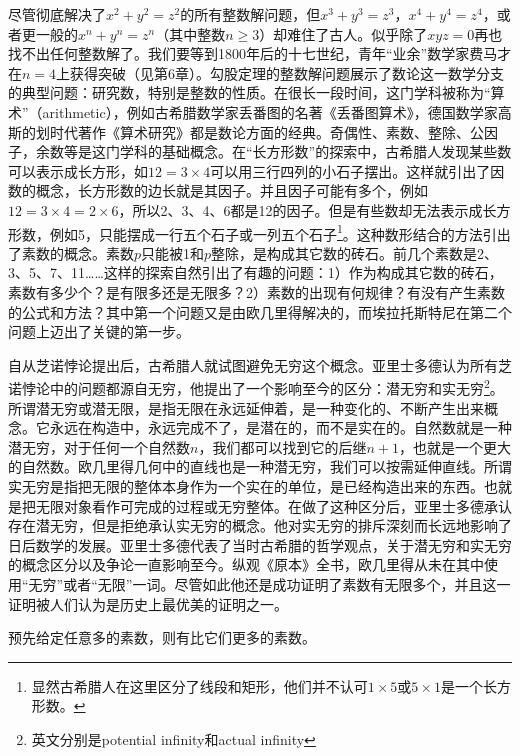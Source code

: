 \documentclass[b5paper]{ctexart}
\begin{document}
尽管彻底解决了$x^2 + y^2 = z^2$的所有整数解问题，但$x^3 + y^3 = z^3$，$x^4 + y^4 = z^4$，或者更一般的$x^n + y^n = z^n$（其中整数$n \geq 3$）却难住了古人。似乎除了$xyz = 0$再也找不出任何整数解了。我们要等到1800年后的十七世纪，青年“业余”数学家费马才在$n = 4$上获得突破（见第6章）。勾股定理的整数解问题展示了数论这一数学分支的典型问题：研究数，特别是整数的性质。在很长一段时间，这门学科被称为“算术”（arithmetic），例如古希腊数学家丢番图的名著《丢番图算术》，德国数学家高斯的划时代著作《算术研究》都是数论方面的经典。奇偶性、素数、整除、公因子，余数等是这门学科的基础概念。在“长方形数”的探索中，古希腊人发现某些数可以表示成长方形，如$12 = 3 \times 4$可以用三行四列的小石子摆出。这样就引出了因数的概念，长方形数的边长就是其因子。并且因子可能有多个，例如$12 = 3 \times 4 = 2 \times 6$，所以2、3、4、6都是12的因子。但是有些数却无法表示成长方形数，例如5，只能摆成一行五个石子或一列五个石子\footnote{显然古希腊人在这里区分了线段和矩形，他们并不认可$1 \times 5$或$5 \times 1$是一个长方形数。}。这种数形结合的方法引出了素数的概念。素数$p$只能被1和$p$整除，是构成其它数的砖石。前几个素数是2、3、5、7、11……这样的探索自然引出了有趣的问题：1）作为构成其它数的砖石，素数有多少个？是有限多还是无限多？2）素数的出现有何规律？有没有产生素数的公式和方法？其中第一个问题又是由欧几里得解决的，而埃拉托斯特尼在第二个问题上迈出了关键的第一步。

自从芝诺悖论提出后，古希腊人就试图避免无穷这个概念。亚里士多德认为所有芝诺悖论中的问题都源自无穷，他提出了一个影响至今的区分：潜无穷和实无穷\footnote{英文分别是potential infinity和actual infinity}。所谓潜无穷或潜无限，是指无限在永远延伸着，是一种变化的、不断产生出来概念。它永远在构造中，永远完成不了，是潜在的，而不是实在的。自然数就是一种潜无穷，对于任何一个自然数$n$，我们都可以找到它的后继$n + 1$，也就是一个更大的自然数。欧几里得几何中的直线也是一种潜无穷，我们可以按需延伸直线。所谓实无穷是指把无限的整体本身作为一个实在的单位，是已经构造出来的东西。也就是把无限对象看作可完成的过程或无穷整体。在做了这种区分后，亚里士多德承认存在潜无穷，但是拒绝承认实无穷的概念。他对实无穷的排斥深刻而长远地影响了日后数学的发展\cite{HanXueTao16}。亚里士多德代表了当时古希腊的哲学观点，关于潜无穷和实无穷的概念区分以及争论一直影响至今。纵观《原本》全书，欧几里得从未在其中使用“无穷”或者“无限”一词。尽管如此他还是成功证明了素数有无限多个，并且这一证明被人们认为是历史上最优美的证明之一。

\begin{theorem}
预先给定任意多的素数，则有比它们更多的素数。
\end{theorem}
\end{document}
